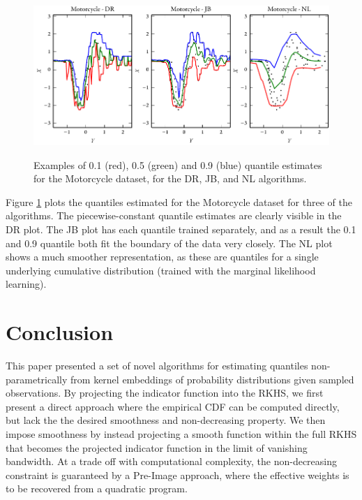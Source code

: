 \documentclass[twoside]{article} \usepackage{aistats2017}
\theoremstyle{definition}
\theoremstyle{theorem}
\begin{document}
		
		\begin{figure}[t]
			\begin{center}
				\includegraphics[width=\columnwidth]{figures/mcquantilesall}\\
			\end{center}
			\caption{Examples of 0.1 (red), 0.5 (green) and 0.9 (blue) quantile estimates for the Motorcycle dataset, for the DR, JB, and NL algorithms.}
			\label{fig:motorcycleresults} 
		\end{figure}
		
		Figure \ref{fig:motorcycleresults} plots the quantiles estimated for the Motorcycle dataset for three of the algorithms. The piecewise-constant quantile estimates are clearly visible in the DR plot. The JB plot has each quantile trained separately, and as a result the 0.1 and 0.9 quantile both fit the boundary of the data very closely. The NL plot shows a much smoother representation, as these are quantiles for a single underlying cumulative distribution (trained with the marginal likelihood learning).

\section{Conclusion}
\label{sec:conclusion}
	
	This paper presented a set of novel algorithms for estimating quantiles non-parametrically from kernel embeddings of probability distributions given sampled observations. By projecting the indicator function into the RKHS, we first present a direct approach where the empirical CDF can be computed directly, but lack the the desired smoothness and non-decreasing property. We then impose smoothness by instead projecting a smooth function within the full RKHS that becomes the projected indicator function in the limit of vanishing bandwidth. At a trade off with computational complexity, the non-decreasing constraint is guaranteed by a Pre-Image approach, where the effective weights is to be recovered from a quadratic program.
	
\end{document}
